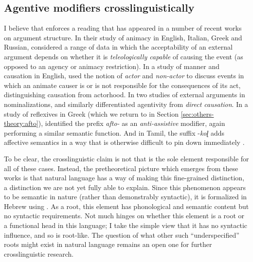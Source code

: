 	\subsection{Agentive modifiers crosslinguistically} \label{voice:va:act}
I believe that {\va} enforces a reading that has appeared in a number of recent works on argument structure. In their study of animacy in English, Italian, Greek and Russian, \cite{folliharley08} considered a range of data in which the acceptability of an external argument depends on whether it is \emph{teleologically capable} of causing the event (as opposed to an agency or animacy restriction). In a study of manner and causation in English, \cite{beaverskoontzgarboden12} used the notion of \emph{actor} and \emph{non-actor} to discuss events in which an animate causer is or is not responsible for the consequences of its act, distinguishing causation from actorhood. In two studies of external arguments in nominalizations, \cite{sichel10n} and \cite{alexiadouetal13} similarly differentiated agentivity from \emph{direct causation}. In a study of reflexives in Greek (which we return to in Section \ref{sec:others-theory:afto}), \cite{spathasetal15} identified the prefix \emph{afto-} as an \emph{anti-assistive} modifier, again performing a similar semantic function. And in Tamil, the suffix -\emph{koɭ} adds affective semantics in a way that is otherwise difficult to pin down immediately \citep{sundaresanmcfadden17}.

To be clear, the crosslinguistic claim is not that {\va} is the sole element responsible for all of these cases. Instead, the pretheoretical picture which emerges from these works is that natural language has a way of making this fine-grained distinction, a distinction we are not yet fully able to explain. Since this phenomenon appears to be semantic in nature (rather than demonstrably syntactic), it is formalized in Hebrew using {\va}. As a root, this element has phonological and semantic content but no syntactic requirements. Not much hinges on whether this element is a root or a functional head in this language; I take the simple view that it has no syntactic influence, and so is root-like. The question of what other such ``underspecified'' roots might exist in natural language remains an open one for further crosslinguistic research.


